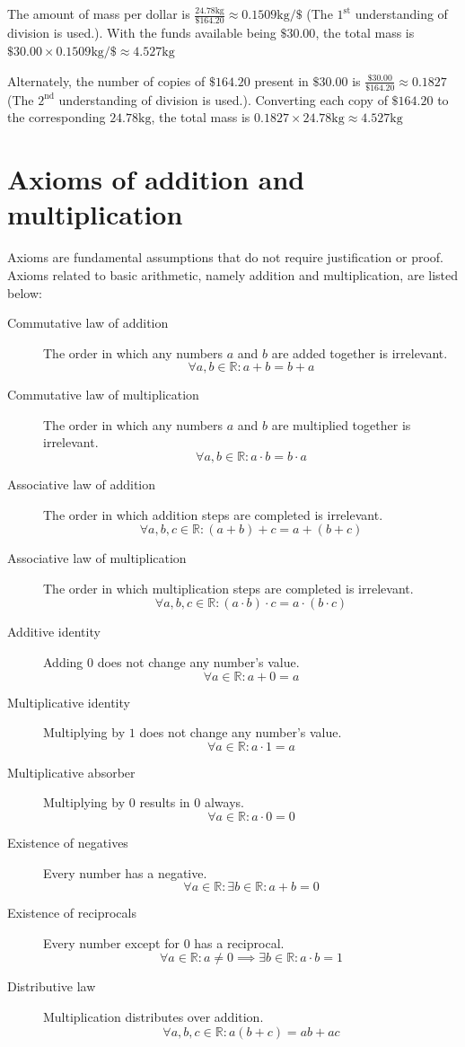 \documentclass{article}
\begin{document}
The amount of mass per dollar is \(\frac{24.78\text{kg}}{\$164.20} \approx 0.1509 \text{kg}/\$\) (The \(1^\text{st}\) understanding of division is used.). With the funds available being \(\$30.00\), the total mass is \(\$30.00 \times 0.1509 \text{kg}/\$ \approx 4.527\text{kg}\) 

Alternately, the number of copies of \(\$164.20\) present in \(\$30.00\) is \(\frac{\$30.00}{\$164.20} \approx 0.1827\) (The \(2^\text{nd}\) understanding of division is used.). Converting each copy of \(\$164.20\) to the corresponding \(24.78\text{kg}\), the total mass is \(0.1827 \times 24.78\text{kg} \approx 4.527\text{kg}\)





\section{Axioms of addition and multiplication}

Axioms are fundamental assumptions that do not require justification or proof. Axioms related to basic arithmetic, namely addition and multiplication, are listed below:

\begin{description}
\item[Commutative law of addition] The order in which any numbers \(a\) and \(b\) are added together is irrelevant.
\[\forall a, b \in \mathbb{R} : a + b = b + a\] 
\item[Commutative law of multiplication] The order in which any numbers \(a\) and \(b\) are multiplied together is irrelevant.
\[\forall a, b \in \mathbb{R} : a \cdot b = b \cdot a\]
\item[Associative law of addition] The order in which addition steps are completed is irrelevant. 
\[\forall a, b, c \in \mathbb{R} : (a + b) + c = a + (b + c)\]
\item[Associative law of multiplication] The order in which multiplication steps are completed is irrelevant. 
\[\forall a, b, c \in \mathbb{R} : (a \cdot b) \cdot c = a \cdot (b \cdot c)\] 
\item[Additive identity] Adding \(0\) does not change any number's value.
\[\forall a \in \mathbb{R} : a + 0 = a\] 
\item[Multiplicative identity] Multiplying by \(1\) does not change any number's value.
\[\forall a \in \mathbb{R} : a \cdot 1 = a\]
\item[Multiplicative absorber] Multiplying by \(0\) results in \(0\) always.
\[\forall a \in \mathbb{R} : a \cdot 0 = 0\]
\item[Existence of negatives] Every number has a negative.
\[\forall a \in \mathbb{R} : \exists b \in \mathbb{R} : a + b = 0\]
\item[Existence of reciprocals] Every number except for \(0\) has a reciprocal.
\[\forall a \in \mathbb{R} : a \neq 0 \implies \exists b \in \mathbb{R} : a \cdot b = 1\]
\item[Distributive law] Multiplication distributes over addition.
\[\forall a, b, c \in \mathbb{R} : a(b + c) = ab + ac\]
\end{description}
\end{document}
